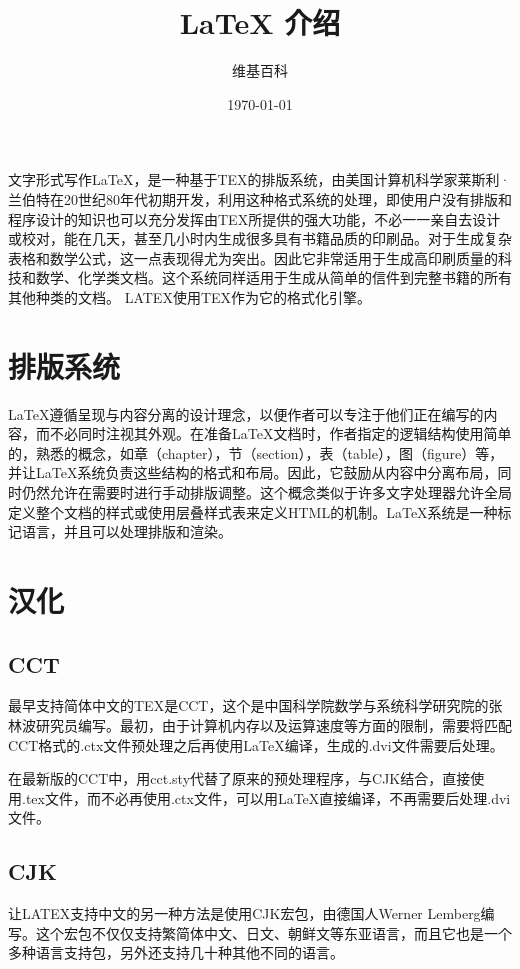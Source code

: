\documentclass[12pt, UTF8, heading = false, scheme = plain]{ctexart}
\title{LaTeX 介绍}
\author{维基百科}
\date{\today}
\begin{document}
    \pagestyle{empty} %

    \clearpage\maketitle
    \thispagestyle{empty} %

    文字形式写作LaTeX，是一种基于TEX的排版系统，由美国计算机科学家莱斯利·兰伯特在20世纪80年代初期开发，利用这种格式系统的处理，即使用户没有排版和程序设计的知识也可以充分发挥由TEX所提供的强大功能，不必一一亲自去设计或校对，能在几天，甚至几小时内生成很多具有书籍品质的印刷品。对于生成复杂表格和数学公式，这一点表现得尤为突出。因此它非常适用于生成高印刷质量的科技和数学、化学类文档。这个系统同样适用于生成从简单的信件到完整书籍的所有其他种类的文档。
    LATEX使用TEX作为它的格式化引擎。

    \section{排版系统}
    LaTeX遵循呈现与内容分离的设计理念，以便作者可以专注于他们正在编写的内容，而不必同时注视其外观。在准备LaTeX文档时，作者指定的逻辑结构使用简单的，熟悉的概念，如章（chapter），节（section），表（table），图（figure）等，并让LaTeX系统负责这些结构的格式和布局。因此，它鼓励从内容中分离布局，同时仍然允许在需要时进行手动排版调整。这个概念类似于许多文字处理器允许全局定义整个文档的样式或使用层叠样式表来定义HTML的机制。LaTeX系统是一种标记语言，并且可以处理排版和渲染。

    \section{汉化}
        \subsection{CCT}
        最早支持简体中文的TEX是CCT，这个是中国科学院数学与系统科学研究院的张林波研究员编写。最初，由于计算机内存以及运算速度等方面的限制，需要将匹配CCT格式的.ctx文件预处理之后再使用LaTeX编译，生成的.dvi文件需要后处理。

        在最新版的CCT中，用cct.sty代替了原来的预处理程序，与CJK结合，直接使用.tex文件，而不必再使用.ctx文件，可以用LaTeX直接编译，不再需要后处理.dvi文件。

        \subsection{CJK}
        让LATEX支持中文的另一种方法是使用CJK宏包，由德国人Werner Lemberg编写。这个宏包不仅仅支持繁简体中文、日文、朝鲜文等东亚语言，而且它也是一个多种语言支持包，另外还支持几十种其他不同的语言。
\end{document}
